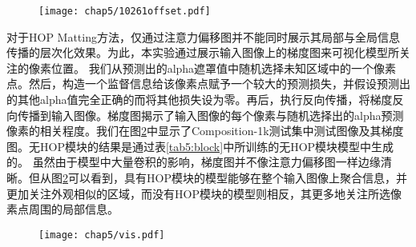 \begin{figure}[t]
	\centering
	\texttt{[image: chap5/10261offset.pdf]}
	\label{fig5:offset}
\end{figure}


对于HOP Matting方法，仅通过注意力偏移图并不能同时展示其局部与全局信息传播的层次化效果。为此，本实验通过展示输入图像上的梯度图来可视化模型所关注的像素位置。
我们从预测出的alpha遮罩值中随机选择未知区域中的一个像素点。然后，构造一个监督信息给该像素点赋予一个较大的预测损失，并假设预测出的其他alpha值完全正确的而将其他损失设为零。再后，执行反向传播，将梯度反向传播到输入图像。梯度图揭示了输入图像的每个像素与随机选择出的alpha预测像素的相关程度。我们在图\ref{fig5:vis}中显示了Composition-1k测试集\cite{xu2017deep}中测试图像及其梯度图。无HOP模块的结果是通过表\ref{tab5:block}中所训练的无HOP模块模型中生成的。
虽然由于模型中大量卷积的影响，梯度图并不像注意力偏移图一样边缘清晰。但从图\ref{fig5:vis}可以看到，具有HOP模块的模型能够在整个输入图像上聚合信息，并更加关注外观相似的区域，而没有HOP模块的模型则相反，其更多地关注所选像素点周围的局部信息。

\begin{figure}[t]
	\centering
	\texttt{[image: chap5/vis.pdf]}
	\label{fig5:vis}
\end{figure}